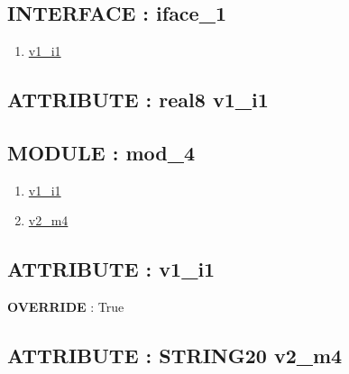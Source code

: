\subsection*{INTERFACE : iface\_1}
\hypertarget{ecldoc:intest.inintest.example_2_intest.inintest.example_2.iface_1}{}
\begin{enumerate}
\item \hyperlink{ecldoc:intest.inintest.example_2_intest.inintest.example_2.iface_1.v1_i1}{v1\_i1}
\end{enumerate}
\subsection*{ATTRIBUTE : real8 v1\_i1}
\hypertarget{ecldoc:intest.inintest.example_2_intest.inintest.example_2.iface_1.v1_i1}{}

\subsection*{MODULE : mod\_4}
\hypertarget{ecldoc:intest.inintest.example_2_intest.inintest.example_2.mod_4}{}
\begin{enumerate}
\item \hyperlink{ecldoc:intest.inintest.example_2_intest.inintest.example_2.mod_4.v1_i1}{v1\_i1}
\item \hyperlink{ecldoc:intest.inintest.example_2_intest.inintest.example_2.mod_4.v2_m4}{v2\_m4}
\end{enumerate}
\subsection*{ATTRIBUTE : v1\_i1}
\hypertarget{ecldoc:intest.inintest.example_2_intest.inintest.example_2.mod_4.v1_i1}{}
\textbf{OVERRIDE} : True \\
\subsection*{ATTRIBUTE : STRING20 v2\_m4}
\hypertarget{ecldoc:intest.inintest.example_2_intest.inintest.example_2.mod_4.v2_m4}{}


